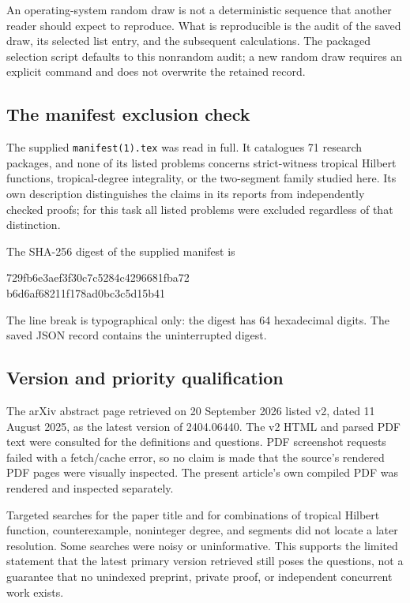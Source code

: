 \documentclass[11pt,a4paper]{article}
\numberwithin{equation}{section}
\theoremstyle{definition}
\theoremstyle{remark}
\begin{document}
An operating-system random draw is not a deterministic sequence that another
reader should expect to reproduce. What is reproducible is the audit of the
saved draw, its selected list entry, and the subsequent calculations. The
packaged selection script defaults to this nonrandom audit; a new random draw
requires an explicit command and does not overwrite the retained record.

\subsection{The manifest exclusion check}

The supplied \texttt{manifest(1).tex} was read in full. It catalogues 71
research packages, and none of its listed problems concerns strict-witness
tropical Hilbert functions, tropical-degree integrality, or the two-segment
family studied here. Its own description distinguishes the claims in its
reports from independently checked proofs; for this task all listed problems
were excluded regardless of that distinction.

The SHA-256 digest of the supplied manifest is
\begin{center}
\small\ttfamily
729fb6e3aef3f30c7c5284c4296681fba72\\
b6d6af68211f178ad0bc3c5d15b41
\end{center}
The line break is typographical only: the digest has 64 hexadecimal digits.
The saved JSON record contains the uninterrupted digest.

\subsection{Version and priority qualification}

The arXiv abstract page retrieved on 20 September 2026 listed v2, dated
11 August 2025, as the latest version of 2404.06440. The v2 HTML and parsed
PDF text were consulted for the definitions and questions. PDF screenshot
requests failed with a fetch/cache error, so no claim is made that the
source's rendered PDF pages were visually inspected. The present article's
own compiled PDF was rendered and inspected separately.

Targeted searches for the paper title and for combinations of tropical
Hilbert function, counterexample, noninteger degree, and segments did not
locate a later resolution. Some searches were noisy or uninformative.
This supports the limited statement that the latest primary version retrieved
still poses the questions, not a guarantee that no unindexed preprint,
private proof, or independent concurrent work exists.
\end{document}
